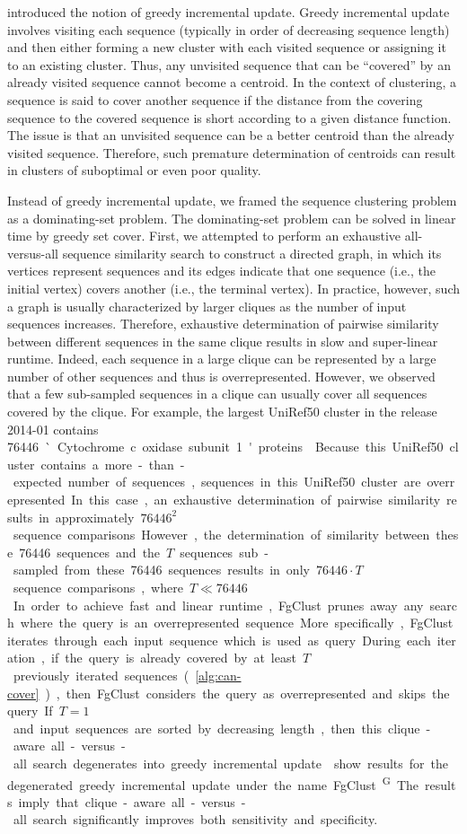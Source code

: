 \documentclass{bioinfo}
\begin{document}
 introduced the notion of greedy incremental update.
Greedy incremental update involves visiting each sequence (typically in order of decreasing sequence length) and then either forming a new cluster with each visited sequence or assigning it to an existing cluster. Thus, any unvisited sequence that can be ``covered'' by an already visited sequence cannot become a centroid. 
In the context of clustering, 
a sequence is said to cover another sequence if the distance from the covering sequence to the covered sequence is short according to a given distance function. 
The issue is that an unvisited sequence can be a better centroid than the already visited sequence. 
Therefore, such premature determination of centroids can result in clusters of suboptimal or even poor quality.

Instead of greedy incremental update, we framed the sequence clustering problem as a dominating-set problem.
The dominating-set problem can be solved in linear time by greedy set cover.
First, we attempted to perform an exhaustive all-versus-all sequence similarity search to construct a directed graph, in which its vertices represent sequences and its edges indicate that one sequence (i.e., the initial vertex) covers another (i.e., the terminal vertex).
In practice, however, such a graph is usually characterized by larger cliques as the number of input sequences increases.
Therefore, exhaustive determination of pairwise similarity between different sequences in the same clique results in slow and super-linear runtime.
Indeed, each sequence in a large clique can be represented by a large number of other sequences and thus is overrepresented.
However, we observed that a few sub-sampled sequences in a clique can usually cover all sequences covered by the clique.
For example, the largest UniRef50 cluster in the release 2014-01 contains \SI{76446} `Cytochrome c oxidase subunit 1' proteins \citep{suzek2014uniref}.
Because this UniRef50 cluster contains a more-than-expected number of sequences, sequences in this UniRef50 cluster are overrepresented.
In this case, an exhaustive determination of pairwise similarity results in approximately \({76446}^2\) sequence comparisons.
However, the determination of similarity between these \SI{76446} sequences and the \(T\) sequences sub-sampled from these \SI{76446} sequences results in only \({76446}\cdot T\) sequence comparisons, where \(T\ll{76446}\).
In order to achieve fast and linear runtime, FgClust prunes away any search where the query is an overrepresented sequence.
More specifically, FgClust iterates through each input sequence which is used as query.
During each iteration,
	if the query is already covered by at least \(T\) previously iterated sequences (\cref{alg:can-cover}), then FgClust considers the query as overrepresented and skips the query.
If \(T=1\) and input sequences are sorted by decreasing length, then this clique-aware all-versus-all search degenerates into greedy incremental update.
 show results for the degenerated greedy incremental update under the name FgClust\textsuperscript{G}. The results imply that clique-aware all-versus-all search significantly improves both sensitivity and specificity.
\end{document}
